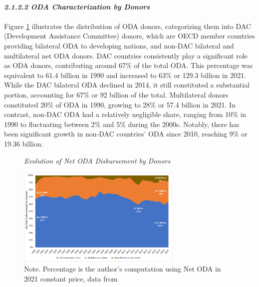 \paragraph{\quad \quad \textit{2.1.2.2  ODA Characterization by Donors}}
\paragraph{}Figure \ref{fig:ODA by donors} illustrates the distribution of ODA donors, categorizing them into DAC (Development Assistance Committee) donors, which are OECD member countries providing bilateral ODA to developing nations, and non-DAC bilateral and multilateral net ODA donors. DAC countries consistently play a significant role as ODA donors, contributing around 67\% of the total ODA. This percentage was equivalent to 61.4 billion in 1990 and increased to 63\% or 129.3 billion in 2021. While the DAC bilateral ODA declined in 2014, it still constituted a substantial portion, accounting for 67\% or 92 billion of the total. Multilateral donors constituted 20\% of ODA in 1990, growing to 28\% or 57.4 billion in 2021. In contrast, non-DAC ODA had a relatively negligible share, ranging from 10\% in 1990 to fluctuating between 2\% and 5\% during the 2000s. Notably, there has been significant growth in non-DAC countries' ODA since 2010, reaching 9\% or 19.36 billion.

\begin{figure}[ht]
\captionsetup{justification=justified,singlelinecheck=false}
\caption{\textit{Evolution of Net ODA Disbursement by Donors}}
    \centering \includegraphics[width = 0.7\textwidth]{Figures/ODA_Graphs/Evolution_Net_ODA.pdf}
    \caption*{\footnotesize{Note. Percentage is the author's computation using Net ODA in 2021 constant price, data from \textcite{oecd_Data_2023}}}
    \label{fig:ODA by donors}
\end{figure}

